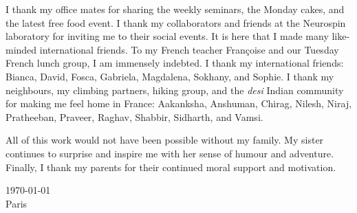I thank my office mates for sharing the weekly seminars, the Monday cakes, and the latest free food event. I thank my collaborators and friends at the Neurospin laboratory for inviting me to their social events. It is here that I made many like-minded international friends. To my French teacher Françoise and our Tuesday French lunch group, I am immensely indebted. I thank my international friends: Bianca, David, Fosca, Gabriela, Magdalena, Sokhany, and Sophie. I thank my neighbours, my climbing partners, hiking group, and the \textit{desi} Indian community for making me feel home in France: Aakanksha, Anshuman, Chirag, Nilesh, Niraj, Pratheeban, Praveer, Raghav, Shabbir, Sidharth, and Vamsi.

All of this work would not have been possible without my family. My sister continues to surprise and inspire me with her sense of humour and adventure. Finally, I thank my parents for their continued moral support and motivation.

\vspace{3em}
\today \\
Paris
